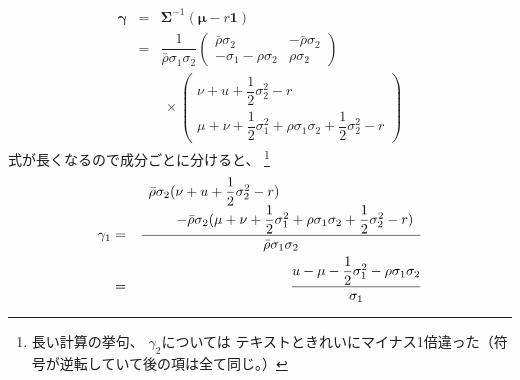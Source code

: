 \documentclass[uplatex,a4j,12pt,dvipdfmx]{jsarticle}
\begin{document}
%
%
\begin{eqnarray*}
	{\bm \gamma}
	&=&
	{\bm \Sigma}^{-1}
	( {\bm \mu} - r {\bm 1} )
	\\ &=&
	\dfrac{1}{ \bar{\rho} \sigma_{1} \sigma_{2} }
	\left(
	\!\!
	\begin{array}{cc}
			\bar{\rho} \sigma_{2}          & - \bar{\rho} \sigma_{2}
			\\
			- \sigma_{1} - \rho \sigma_{2} & \rho \sigma_{2}
		\end{array}
	\!\!
	\right)
	\\ && \ \times
	\left(
	\begin{array}{c}
			\nu + u + \dfrac{1}{2} \sigma_{2}^{2} - r
			\\
			\mu + \nu + \dfrac{1}{2} \sigma_{1}^{2} + \rho \sigma_{1} \sigma_{2} + \dfrac{1}{2} \sigma_{2}^{2} - r
		\end{array}
	\right)
\end{eqnarray*}
%
%
式が長くなるので成分ごとに分けると、
\footnote{
	長い計算の挙句、
	$\gamma_{2}$については
	テキストときれいにマイナス1倍違った（符号が逆転していて後の項は全て同じ。）
}
%
%
\begin{eqnarray*}
	\gamma_{1}
	&=&
	\dfrac{
		\begin{array}{l}
			\bar{\rho} \sigma_{2}
			( \nu + u + \dfrac{1}{2} \sigma_{2}^{2} - r )
			\\ \hspace{7mm}
			- \bar{\rho} \sigma_{2}
			( \mu + \nu + \dfrac{1}{2} \sigma_{1}^{2} + \rho \sigma_{1} \sigma_{2} + \dfrac{1}{2} \sigma_{2}^{2} - r )
		\end{array}
	}
	{ \bar{\rho} \sigma_{1} \sigma_{2} }
	\\ &=&
	\dfrac{
		u
		-
		\mu - \dfrac{1}{2} \sigma_{1}^{2} - \rho \sigma_{1} \sigma_{2}
	}
	{ \sigma_{1} }
\end{eqnarray*}
%
%
\end{document}
